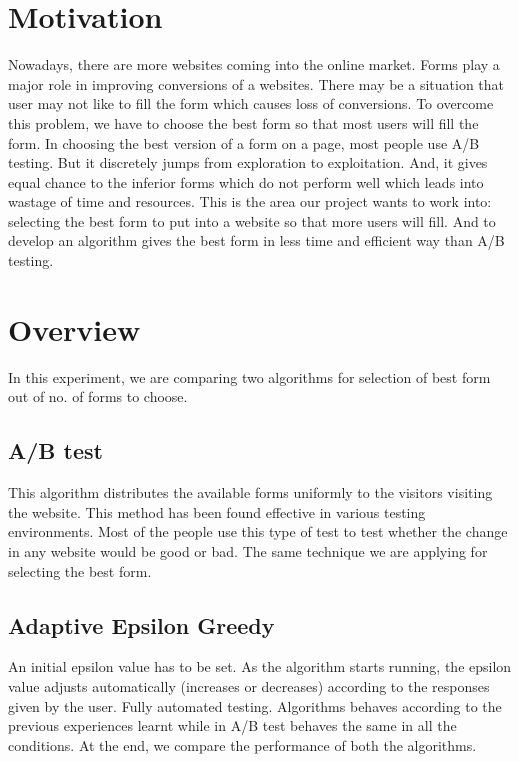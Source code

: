 \documentclass[12pt]{report}
\begin{document}
\section{
Motivation}
Nowadays, there are more websites coming into the online market. Forms play a major role in improving conversions of a websites. There may be a situation that user may not like to fill the form which causes loss of conversions\cite{nielsen1994usability}. To overcome this problem, we have to choose the best form so that most users will fill the form. In choosing the best version of a form on a page, most people use A/B testing. But it discretely jumps from exploration to exploitation. And, it gives equal chance to the inferior forms which do not perform well which leads into wastage of time and resources.\cite{lattimore2018bandit}
This is the area our project wants to work into: selecting the best form to put into a website so that more users will fill. And to develop an algorithm gives the best form in less time and efficient way than A/B testing.
\newpage
\section{Overview}
In this experiment, we are comparing two algorithms for selection of best form out of no. of forms to choose. 
\subsection{A/B test}
This algorithm distributes the available forms uniformly to the visitors visiting the website. This method has been found effective in various testing environments. Most of the people use this type of test to test whether the change in any website would be good or bad. The same technique we are applying for selecting the best form\cite{white2012bandit}. 

\subsection{Adaptive Epsilon Greedy}
An initial epsilon value has to be set. As the algorithm starts running, the epsilon value adjusts automatically (increases or decreases) according to the responses given by the user. Fully automated testing. Algorithms behaves according to the previous experiences learnt while in A/B test behaves the same in all the conditions\cite{white2012bandit}.
\newline
At the end, we compare the performance of both the algorithms.
\end{document}
